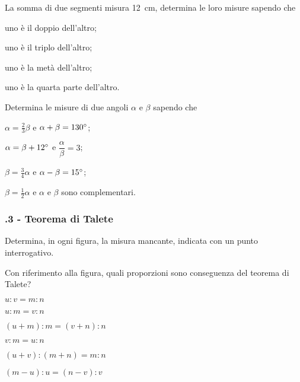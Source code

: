\begin{multicols}{2}
\begin{esercizio}
\label{ese:6.29}
La somma di due segmenti misura 12~cm, determina le loro misure sapendo che
\begin{enumeratea}
\item uno è il doppio dell'altro;
\item uno è il triplo dell'altro;
\item uno è la metà dell'altro;
\item uno è la quarta parte dell'altro.
\end{enumeratea}
\end{esercizio}

\begin{esercizio}
\label{ese:6.30}
Determina le misure di due angoli $\alpha$ e $\beta$ sapendo che
\begin{enumeratea}
\item $\alpha = \frac{2}{3}\beta$ e $\alpha+\beta=130{}^{\circ}$;
\item $\alpha = \beta + 12{}^{\circ}$ e $\dfrac{\alpha}{\beta}=3$;
\item $\beta = \frac{3}{4}\alpha$ e $\alpha-\beta=15{}^{\circ}$;
\item $\beta=\frac{1}{2}\alpha$ e $\alpha$ e $\beta$ sono complementari.
\end{enumeratea}
\end{esercizio}

\end{multicols}

\subsubsection*{\thechapter.3 - Teorema di Talete}

\begin{esercizio}
\label{ese:6.31}
Determina, in ogni figura, la misura mancante, indicata con un punto interrogativo.
\end{esercizio}

\begin{esercizio}
\label{ese:6.32}
Con riferimento alla figura, quali proporzioni sono conseguenza del teorema di Talete?
\begin{enumeratea}
\item $u : v = m : n$
\item $u : m = v : n$
\item $(u+m) : m = (v+n) : n$
\item $v : m = u : n$
\item $(u + v) : (m + n) = m : n$
\item $(m-u) : u = (n-v) : v$
\end{enumeratea}
\end{esercizio}

